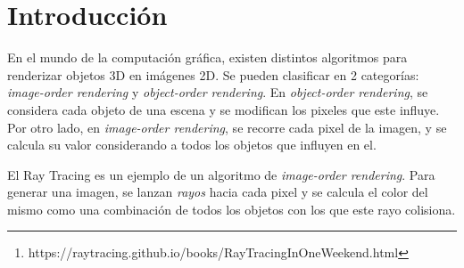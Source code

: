 \begin{abstract}
    En este trabajo implementaremos un Ray Tracer basado en las guías de Shirley
    \footnote[1]{https://raytracing.github.io/books/RayTracingInOneWeekend.html} capaz de renderizar
    distintos objetos (esferas,
    cubos, planos y mallas de triángulos) y materiales (dieléctricos, metales y colores difusos).
    Además veremos una de las estructuras más utilizada para optimizar el renderizado cuando tenemos
    muchos objetos en una escena, el KD Tree.
\end{abstract}


\section{Introducción} \label{sec:introduccion}

En el mundo de la computación gráfica, existen distintos algoritmos para renderizar objetos 3D
en imágenes 2D. Se pueden clasificar en 2 categorías: \textit{image-order
rendering} y \textit{object-order rendering}.
En \textit{object-order rendering}, se considera cada objeto de una escena y se modifican los
pixeles que este influye.
Por otro lado, en \textit{image-order rendering}, se recorre cada pixel de la imagen, y se
calcula su valor considerando a todos los objetos que influyen en el.

El Ray Tracing es un ejemplo de un algoritmo de \textit{image-order rendering}.
Para generar una imagen, se lanzan \textit{rayos} hacia cada pixel y se calcula el color del
mismo como una combinación de todos los objetos con los que este rayo colisiona.